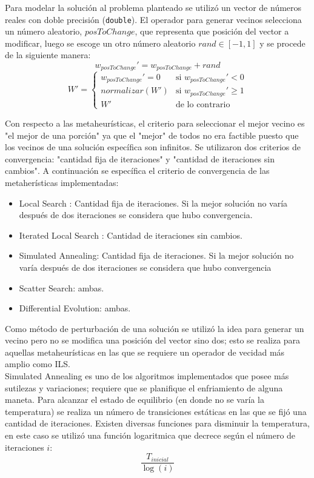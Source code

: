 \documentclass{ci5652}
\begin{document}
Para modelar la solución al problema planteado se utilizó un vector de números
reales con doble precisión (\texttt{double}). El operador para generar vecinos
selecciona un número aleatorio, $posToChange$, que representa que posición del
vector  a modificar, luego se escoge un otro número aleatorio $rand \in [-1, 1]$
y se procede de la siguiente manera:
$$w_{posToChange}' =  w_{posToChange} + rand$$
\[
  W' =
  \begin{cases}
    w_{posToChange}' = 0 & \text{si } w_{posToChange}' < 0\\
    normalizar(W')       & \text{si } w_{posToChange}' \geq 1\\
    W'                   & \text{de lo contrario}
  \end{cases} 
\]

Con respecto a las metaheurísticas, el criterio para seleccionar el mejor vecino
es "el mejor de una porción" ya que el "mejor" de todos no era factible puesto que los vecinos de una solución específica son infinitos. Se utilizaron dos 
criterios de convergencia: "cantidad fija de iteraciones" y "cantidad de 
iteraciones sin cambios". A continuación se específica el criterio de 
convergencia de las metaherísticas implementadas:

\begin{itemize}
  \item Local Search : Cantidad fija de iteraciones. Si la mejor solución no 
  varía después de dos iteraciones se considera que hubo convergencia.
  \item Iterated Local Search : Cantidad de iteraciones sin cambios.
  \item Simulated Annealing: Cantidad fija de iteraciones. Si la mejor solución 
  no varía después de dos iteraciones se considera que hubo convergencia
  \item Scatter Search: ambas.
  \item Differential Evolution: ambas.
\end{itemize}

Como método de perturbación de una solución se utilizó la idea para generar un 
vecino pero no se modifica una posición del vector sino dos; esto se realiza 
para aquellas metaheurísticas en las que se requiere un operador de vecidad 
más amplio como ILS.\\

Simulated Annealing es uno de los algoritmos implementados que posee más sutilezas y variaciones; requiere que se planifique el enfriamiento de alguna maneta. Para alcanzar el estado de equilibrio (en donde no se varía la temperatura) se realiza un número de transiciones estáticas en las que se fijó una cantidad de iteraciones. Existen diversas funciones para disminuir la temperatura, en este caso se utilizó una función logaritmica que decrece según el número de iteraciones $i$: $$\frac{T_{inicial}}{\log(i)}$$
\end{document}
